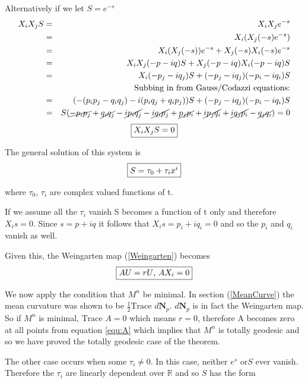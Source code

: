 Alternatively if we let $S=e^{-s}$
\begin{eqnarray}
\nonumber
X_iX_jS &=& X_iX_je^{-s}  \\
\nonumber
&=&X_i(X_j(-s)e^{-s}) \\
\nonumber
&=&X_i(X_j(-s))e^{-s}+X_j(-s)X_i(-s)e^{-s} \\
\nonumber
&=& X_iX_j(-p-iq)S+X_j(-p-iq)X_i(-p-iq)S \\
\nonumber
&=& X_i(-p_j-iq_j)S+(-p_j-iq_j)(-p_i-iq_i)S \\
\nonumber
&\ &\mbox{Subbing in from Gauss/Codazzi equations:} \\
\nonumber
&=&(-(p_ip_j-q_iq_j)-i(p_iq_j+q_ip_j))S+(-p_j-iq_j)(-p_i-iq_i)S \\
\nonumber
&=&S(\cancel{-p_ip_j}+\cancel{q_iq_j}-\cancel{i p_iq_j}-\cancel{i q_ip_j}+\cancel{p_jp_i}+\cancel{ip_jq_i}+\cancel{iq_jp_i}-\cancel{q_jq_i}) = 0
\end{eqnarray}
\begin{equation}
\framebox{$X_iX_jS=0$}
\label{X_iX_jS}
\end{equation}

The general solution of this system is
\begin{equation}
\framebox{$S = \tau_0 + \tau_ix^i $}
\label{genSol}
\end{equation}

where $\tau_0$, $\tau_i$ are complex valued functions of t. 

If we assume all the $\tau_i$ vanish S becomes a function of t only and therefore $X_is = 0$. Since $s=p+iq$ it follows that $X_is = p_i+iq_i = 0$ and so the $p_i$ and $q_i$ vanish as well.

Given this, the Weingarten map (\ref{Weingarten}) becomes 
\begin{equation}
\framebox{$AU = rU$, $AX_i = 0$}
\label{equ:A}
\end{equation}

We now apply the condition that $M^n$ be minimal. In section (\ref{MeanCurve}) the mean curvature was shown to be $\frac{1}{2}\mbox{Trace }d\mathbf N_p$. $d\mathbf N_p$ is in fact the Weingarten map. So if $M^n$ is minimal, $\mbox{Trace }A=0$ which means $r=0$, therefore A becomes zero at all points from equation \ref{equ:A} which implies that $M^n$ is totally geodesic and so we have proved the totally geodesic case of the theorem.

The other case occurs when some $\tau_i \neq 0$. In this case, neither $e^s$ or$S$ ever vanish. Therefore the $\tau_i$ are linearly dependent over $\mathbb R$ and so $S$ has the form

